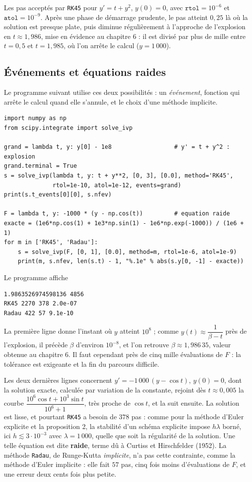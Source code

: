 \documentclass[a4paper,twoside]{report}
\newcommand{\mot}[1]{\textcolor{rougecours}{\textbf{#1}}}
\begin{document}
\noindent Les pas acceptés par \texttt{RK45} pour $y' = t + y^{2}$, $y(0) = 0$, avec $\texttt{rtol} = 10^{-6}$ et $\texttt{atol} = 10^{-9}$. Après une phase de démarrage prudente, le pas atteint $0{,}25$ là où la solution est presque plate, puis diminue régulièrement à l'approche de l'explosion en $t \approx 1{,}986$, mise en évidence au chapitre 6 : il est divisé par plus de mille entre $t = 0{,}5$ et $t = 1{,}985$, où l'on arrête le calcul ($y = 1\,000$).

\subsection{Événements et équations raides}

Le programme suivant utilise ces deux possibilités : un \emph{événement}, fonction qui arrête le calcul quand elle s'annule, et le choix d'une méthode implicite.

\begin{lstlisting}
import numpy as np
from scipy.integrate import solve_ivp

grand = lambda t, y: y[0] - 1e8                  # y' = t + y^2 : explosion
grand.terminal = True
s = solve_ivp(lambda t, y: t + y**2, [0, 3], [0.0], method='RK45',
              rtol=1e-10, atol=1e-12, events=grand)
print(s.t_events[0][0], s.nfev)

F = lambda t, y: -1000 * (y - np.cos(t))         # equation raide
exacte = (1e6*np.cos(1) + 1e3*np.sin(1) - 1e6*np.exp(-1000)) / (1e6 + 1)
for m in ['RK45', 'Radau']:
    s = solve_ivp(F, [0, 1], [0.0], method=m, rtol=1e-6, atol=1e-9)
    print(m, s.nfev, len(s.t) - 1, "%.1e" % abs(s.y[0, -1] - exacte))
\end{lstlisting}

\noindent Le programme affiche
\begin{verbatim}
1.9863526974598136 4856
RK45 2270 378 2.0e-07
Radau 422 57 9.1e-10
\end{verbatim}

\noindent La première ligne donne l'instant où $y$ atteint $10^{8}$ ; comme $y(t) \approx \dfrac{1}{\beta - t}$ près de l'explosion, il précède $\beta$ d'environ $10^{-8}$, et l'on retrouve $\beta \approx 1{,}986\,35$, valeur obtenue au chapitre 6. Il faut cependant près de cinq mille évaluations de $F$ : la tolérance est exigeante et la fin du parcours difficile.

\noindent Les deux dernières lignes concernent $y' = -1\,000\,(y - \cos t)$, $y(0) = 0$, dont la solution exacte, calculée par variation de la constante, rejoint dès $t \approx 0{,}005$ la courbe $\dfrac{10^{6}\cos t + 10^{3}\sin t}{10^{6} + 1}$, très proche de $\cos t$, et la suit ensuite. La solution est lisse, et pourtant \texttt{RK45} a besoin de $378$ pas : comme pour la méthode d'Euler explicite et la proposition 2, la stabilité d'un schéma explicite impose $h\lambda$ borné, ici $h \lesssim 3 \cdot 10^{-3}$ avec $\lambda = 1\,000$, quelle que soit la régularité de la solution. Une telle équation est dite \mot{raide}, terme dû à Curtiss et Hirschfelder (1952). La méthode \texttt{Radau}, de Runge-Kutta \emph{implicite}, n'a pas cette contrainte, comme la méthode d'Euler implicite : elle fait $57$ pas, cinq fois moins d'évaluations de $F$, et une erreur deux cents fois plus petite.
\end{document}
